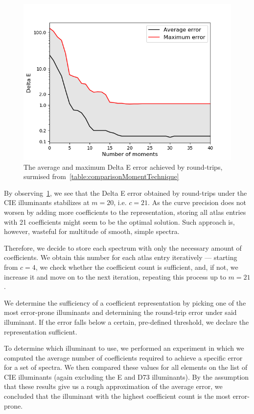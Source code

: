 \begin{figure}[t!]
	\centering
	\includegraphics[width=0.6\linewidth]{img/results_noOfMoments_deltaE.png}
	\caption{The average and maximum Delta E error achieved by round-trips, surmised from~\cref{table:comparisonMomentTechnique}}
	\label{fig:results_noOfMoments_deltaE}
\end{figure}

By observing~\cref{fig:results_noOfMoments_deltaE}, we see that the Delta E error obtained by round-trips under the CIE illuminants stabilizes at $m=20$, i.e. $c=21$. As the curve precision does not worsen by adding more coefficients to the representation, storing all atlas entries with 21 coefficients might seem to be the optimal solution. Such approach is, however, wasteful for multitude of smooth, simple spectra.

Therefore, we decide to store each spectrum with only the necessary amount of coefficients. We obtain this number for each atlas entry iteratively --- starting from $c=4$, we check whether the coefficient count is sufficient, and, if not, we increase it and move on to the next iteration, repeating this process up to $m=21$.

We determine the sufficiency of a coefficient representation by picking one of the most error-prone illuminants and determining the round-trip error under said illuminant. If the error falls below a certain, pre-defined threshold, we declare the representation sufficient.

To determine which illuminant to use, we performed an experiment in which we computed the average number of coefficients required to achieve a specific error for a set of spectra. We then compared these values for all elements on the list of CIE illuminants (again excluding the E and D73 illuminants). By the assumption that these results give us a rough approximation of the average error, we concluded that the illuminant with the highest coefficient count is the most error-prone.

